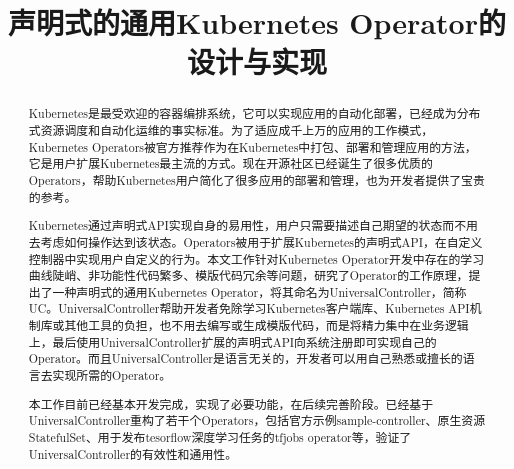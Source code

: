 \documentclass[macfonts,master]{njuthesis}
\title{声明式的通用Kubernetes Operator的设计与实现}
\institute{南京大学}
\begin{document}

\makenlctitle
\maketitle
\makeenglishtitle


\frontmatter

\begin{abstract}
Kubernetes是最受欢迎的容器编排系统，它可以实现应用的自动化部署，已经成为分布式资源调度和自动化运维的事实标准。为了适应成千上万的应用的工作模式，Kubernetes Operators被官方推荐作为在Kubernetes中打包、部署和管理应用的方法，它是用户扩展Kubernetes最主流的方式。现在开源社区已经诞生了很多优质的Operators，帮助Kubernetes用户简化了很多应用的部署和管理，也为开发者提供了宝贵的参考。

Kubernetes通过声明式API实现自身的易用性，用户只需要描述自己期望的状态而不用去考虑如何操作达到该状态。Operators被用于扩展Kubernetes的声明式API，在自定义控制器中实现用户自定义的行为。本文工作针对Kubernetes Operator开发中存在的学习曲线陡峭、非功能性代码繁多、模版代码冗余等问题，研究了Operator的工作原理，提出了一种声明式的通用Kubernetes Operator，将其命名为UniversalController，简称UC。UniversalController帮助开发者免除学习Kubernetes客户端库、Kubernetes API机制库或其他工具的负担，也不用去编写或生成模版代码，而是将精力集中在业务逻辑上，最后使用UniversalController扩展的声明式API向系统注册即可实现自己的Operator。而且UniversalController是语言无关的，开发者可以用自己熟悉或擅长的语言去实现所需的Operator。

本工作目前已经基本开发完成，实现了必要功能，在后续完善阶段。已经基于UniversalController重构了若干个Operators，包括官方示例sample-controller、原生资源StatefulSet、用于发布tesorflow深度学习任务的tfjobs operator等，验证了UniversalController的有效性和通用性。

\end{abstract}
\end{document}
